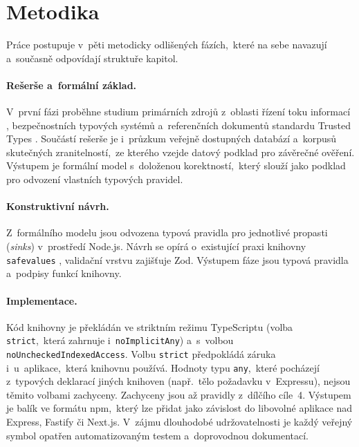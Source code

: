 \section{Metodika}

Práce postupuje v~pěti metodicky odlišených fázích,~které na sebe navazují a~současně odpovídají struktuře kapitol.

\paragraph{Rešerše a~formální základ.}
V~první fázi proběhne studium primárních zdrojů z~oblasti řízení toku informací \parencite{denning1976lattice,sabelfeld2003language}, bezpečnostních typových systémů \parencite{volpano1996sound,zdancewic2003robust} a~referenčních dokumentů standardu Trusted Types \parencite{w3cTrustedTypes}. Součástí rešerše je i~průzkum veřejně dostupných databází a~korpusů skutečných zranitelností,~ze kterého vzejde datový podklad pro závěrečné ověření. Výstupem je formální model s~doloženou korektností,~který slouží jako podklad pro odvození vlastních typových pravidel.

\paragraph{Konstruktivní návrh.}
Z~formálního modelu jsou odvozena typová pravidla pro jednotlivé propasti (\emph{sinks}) v~prostředí Node.js. Návrh se opírá o~existující praxi knihovny \texttt{safevalues} \parencite{googleSafevalues}, validační vrstvu zajišťuje Zod. Výstupem fáze jsou typová pravidla a~podpisy funkcí knihovny.

\paragraph{Implementace.}
Kód knihovny je překládán ve striktním režimu TypeScriptu (volba \texttt{strict},~která zahrnuje i~\texttt{noImplicitAny}) a~s~volbou \texttt{noUncheckedIndexedAccess}. Volbu \texttt{strict} předpokládá záruka i~u~aplikace,~která knihovnu používá. Hodnoty typu \texttt{any},~které pocházejí z~typových deklarací jiných knihoven (např.~tělo požadavku v~Expressu), nejsou těmito volbami zachyceny. Zachyceny jsou až pravidly z~dílčího cíle~4. Výstupem je balík ve formátu npm,~který lze přidat jako závislost do libovolné aplikace nad Express, Fastify či Next.js. V~zájmu dlouhodobé udržovatelnosti je každý veřejný symbol opatřen automatizovaným testem a~doprovodnou dokumentací.

